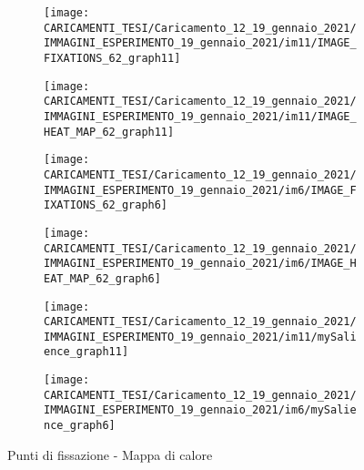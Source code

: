 \documentclass[%
	corpo=12pt,
    twoside,
    stile=classica,
    oldstyle,
    tipotesi=custom,
    greek,
    evenboxes,
]{toptesi}
\begin{document}
{\begin{figure}[!htb]\centering
\begin{subfigure}
\centering
\texttt{[image: CARICAMENTI\_TESI/Caricamento\_12\_19\_gennaio\_2021/IMMAGINI\_ESPERIMENTO\_19\_gennaio\_2021/im11/IMAGE\_FIXATIONS\_62\_graph11]}
\end{subfigure}
\begin{subfigure}
\centering
\texttt{[image: CARICAMENTI\_TESI/Caricamento\_12\_19\_gennaio\_2021/IMMAGINI\_ESPERIMENTO\_19\_gennaio\_2021/im11/IMAGE\_HEAT\_MAP\_62\_graph11]}
\end{subfigure}
\begin{subfigure}
\centering
\texttt{[image: CARICAMENTI\_TESI/Caricamento\_12\_19\_gennaio\_2021/IMMAGINI\_ESPERIMENTO\_19\_gennaio\_2021/im6/IMAGE\_FIXATIONS\_62\_graph6]}
\end{subfigure}
\begin{subfigure}
\centering
\texttt{[image: CARICAMENTI\_TESI/Caricamento\_12\_19\_gennaio\_2021/IMMAGINI\_ESPERIMENTO\_19\_gennaio\_2021/im6/IMAGE\_HEAT\_MAP\_62\_graph6]}
\end{subfigure}
\begin{subfigure}
\centering
\texttt{[image: CARICAMENTI\_TESI/Caricamento\_12\_19\_gennaio\_2021/IMMAGINI\_ESPERIMENTO\_19\_gennaio\_2021/im11/mySalience\_graph11]}
\end{subfigure}
\begin{subfigure}
\centering
\texttt{[image: CARICAMENTI\_TESI/Caricamento\_12\_19\_gennaio\_2021/IMMAGINI\_ESPERIMENTO\_19\_gennaio\_2021/im6/mySalience\_graph6]}
\end{subfigure}
\caption{Punti di fissazione - Mappa di calore}\label{fig: IMAGE_FIXATIONS_62_graph11}
\end{figure}

%
%



}
\end{document}
